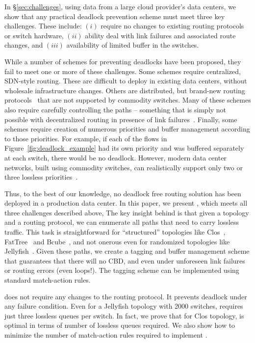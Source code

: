 In \S\ref{sec:challenges}, using data from a large cloud provider's data
centers, we show that any practical deadlock prevention scheme must meet three
key challenges. These include: $(i)$ require no changes to existing routing
protocols or switch hardware, $(ii)$ ability deal with link failures and
associated  route changes, and $(iii)$ availability of limited buffer in
the switches.

While a number of schemes for preventing deadlocks have been proposed, they fail
to meet one or more of these challenges.  Some schemes require centralized,
SDN-style routing.  These are difficult to deploy in existing data centers,
without wholesale infrastructure changes.  Others are distributed, but brand-new
routing protocols~\cite{tcpbolt} that are not supported by commodity switches.
Many of these schemes also require carefully controlling the paths -- something
that is simply not possible with decentralized routing in presence of link
failures~\cite{netpilot}.  Finally, some schemes require creation of numerous
priorities and buffer management according to those priorities. For example, if
each of the flows in Figure~\ref{fig:deadlock_example} had its own priority and
was buffered separately at each switch, there would be no deadlock.  However,
modern data center networks, built using commodity switches, can realistically
support only two or three lossless priorities~\cite{rdmaatscale}.

Thus, to the best of our knowledge, no deadlock free routing solution has been
deployed in a production data center.  In this paper, we present \sysname{},
which meets all three challenges described above, The key insight behind
\sysname{} is that given a topology and a routing protocol, we can enumerate all
paths that need to carry lossless traffic. This task is straightforward for
``structured'' topologies like Clos~\cite{clos}, FatTree~\cite{fattree} and
Bcube~\cite{bcube}, and not onerous even for randomized topologies like
Jellyfish~\cite{jellyfish}.  Given these paths, we create a tagging and buffer
management scheme that guarantees that there will no CBD, and even under
unforeseen link failures or routing errors (even loops!). The tagging scheme can be
implemented using standard match-action rules.

\sysname{} does not require any changes to the routing protocol. It prevents
deadlock under any failure condition. Even for a Jellyfish topology with 2000
switches, \sysname{} requires just three lossless queues per switch.  In fact,
we prove that for Clos topology,  \sysname{} is optimal in terms of number of
lossless queues required.  We also show how to minimize the number of
match-action rules required to implement \sysname{}.

